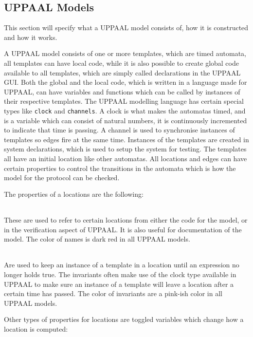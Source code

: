 \subsection{UPPAAL Models}\label{UPPAAL_Models}
This section will specify what a UPPAAL model consists of, how it is constructed and how it works.

A UPPAAL model consists of one or more templates, which are timed automata, all templates can have local code, while it is also possible to create global code available to all templates, which are simply called declarations in the UPPAAL GUI.
Both the global and the local code, which is written in a language made for UPPAAL, can have variables and functions which can be called by instances of their respective templates.
The UPPAAL modelling language has certain special types like \texttt{clock} and \texttt{channels}.
A clock is what makes the automatas timed, and is a variable which can consist of natural numbers, it is continuously incremented to indicate that time is passing.
A channel is used to synchronise instances of templates so edges fire at the same time.
Instances of the templates are created in system declarations, which is used to setup the system for testing.
The templates all have an initial location like other automatas.
All locations and edges can have certain properties to control the transitions in the automata which is how the model for the protocol can be checked.

\bigskip\noindent
The properties of a locations are the following: 

\begin{description}[labelindent=\parindent]
    \item[Name]\hfill\\
    These are used to refer to certain locations from either the code for the model, or in the verification aspect of UPPAAL. It is also useful for documentation of the model. The color of names is dark red in all UPPAAL models.
    \item[Invariants]\hfill\\
    Are used to keep an instance of a template in a location until an expression no longer holds true. The invariants often make use of the clock type available in UPPAAL to make sure an instance of a template will leave a location after a certain time has passed. The color of invariants are a pink-ish color in all UPPAAL models.
\end{description}

\noindent
Other types of properties for locations are toggled variables which change how a location is computed:

